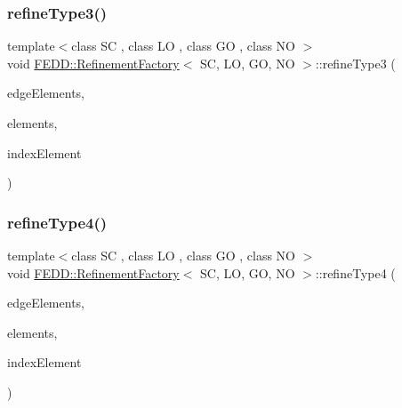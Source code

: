 \mbox{\label{classFEDD_1_1RefinementFactory_a282ee48e155d2f3f0e0a3faa0fa275d2}} 
\subsubsection{\texorpdfstring{refine\+Type3()}{refineType3()}}
{\footnotesize\ttfamily template$<$class SC , class LO , class GO , class NO $>$ \\
void \hyperlink{classFEDD_1_1RefinementFactory}{F\+E\+D\+D\+::\+Refinement\+Factory}$<$ SC, LO, GO, NO $>$\+::refine\+Type3 (\begin{DoxyParamCaption}\item[{\hyperlink{classFEDD_1_1RefinementFactory_ae5285e990ec4632d6188a1280627ad13}{Edge\+Elements\+Ptr\+\_\+\+Type}}]{edge\+Elements,  }\item[{\hyperlink{classFEDD_1_1RefinementFactory_a0994b5b7b6d080048673941251999f2e}{Elements\+Ptr\+\_\+\+Type}}]{elements,  }\item[{int}]{index\+Element }\end{DoxyParamCaption})}

\mbox{\label{classFEDD_1_1RefinementFactory_acb0db07f3517256e51e05380467c9782}} 
\subsubsection{\texorpdfstring{refine\+Type4()}{refineType4()}}
{\footnotesize\ttfamily template$<$class SC , class LO , class GO , class NO $>$ \\
void \hyperlink{classFEDD_1_1RefinementFactory}{F\+E\+D\+D\+::\+Refinement\+Factory}$<$ SC, LO, GO, NO $>$\+::refine\+Type4 (\begin{DoxyParamCaption}\item[{\hyperlink{classFEDD_1_1RefinementFactory_ae5285e990ec4632d6188a1280627ad13}{Edge\+Elements\+Ptr\+\_\+\+Type}}]{edge\+Elements,  }\item[{\hyperlink{classFEDD_1_1RefinementFactory_a0994b5b7b6d080048673941251999f2e}{Elements\+Ptr\+\_\+\+Type}}]{elements,  }\item[{int}]{index\+Element }\end{DoxyParamCaption})}

